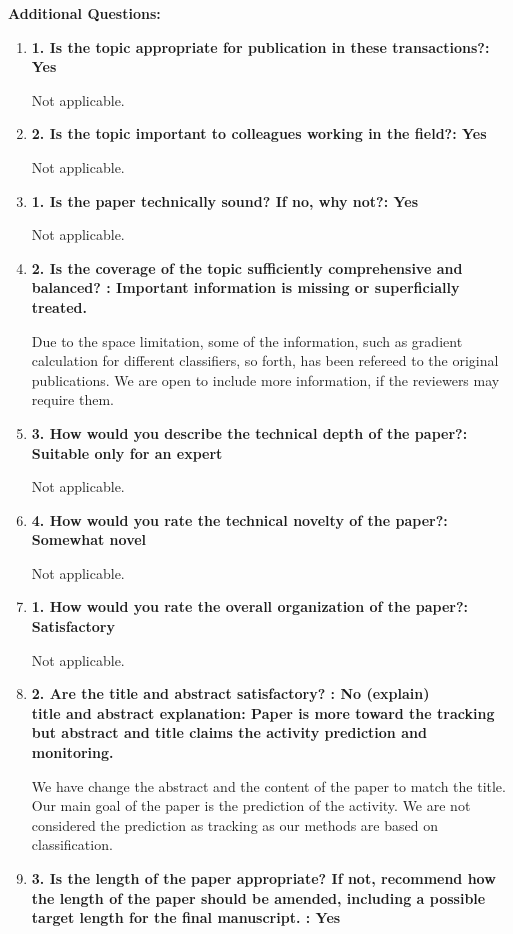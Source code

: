 \documentclass[12pt]{article}
\begin{document}
\textbf{Additional Questions:}

\begin{enumerate}

\item \textbf{1. Is the topic appropriate for publication in these transactions?: Yes}

Not applicable. 

\item \textbf{2. Is the topic important to colleagues working in the field?: Yes}

Not applicable.

\item \textbf{1. Is the paper technically sound? If no, why not?: Yes}

Not applicable.

\item \textbf{2. Is the coverage of the topic sufficiently comprehensive and balanced? : 
Important information is missing or superficially treated.}

Due to the space limitation, some of the information, such as gradient calculation for 
different classifiers, so forth, has been refereed to the original publications. We are 
open to include more information, if the reviewers may require them. 

\item \textbf{3. How would you describe the technical depth of the paper?: Suitable only 
for an expert}

Not applicable.

\item \textbf{4. How would you rate the technical novelty of the paper?: Somewhat novel}

Not applicable.

\item \textbf{1. How would you rate the overall organization of the paper?: Satisfactory}

Not applicable.

\item \textbf{2. Are the title and abstract satisfactory? : No (explain) \\
title and abstract explanation: Paper is more toward the tracking but abstract and title 
claims the activity prediction and monitoring.}

We have change the abstract and the content of the paper to match the title. Our main 
goal of the paper is the prediction of the activity. We are not considered the prediction 
as tracking as our methods are based on classification.  

\item \textbf{3. Is the length of the paper appropriate? If not, recommend how the length 
of the paper should be amended, including a possible target length for the final 
manuscript. : Yes}

\end{enumerate}
\end{document}
